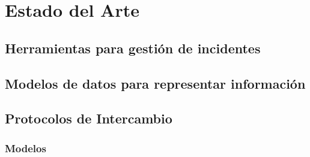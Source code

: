 \chapter{Estado del Arte}
\label{capitulo2}

%

\section{Herramientas para gestión de incidentes}
\label{herramientas}


\section{Modelos de datos para representar información}
\label{modelodedatos}



%



\section{Protocolos de Intercambio}
\label{protocolos}
 
 
\subsection{Modelos}
\label{modelos}
 
